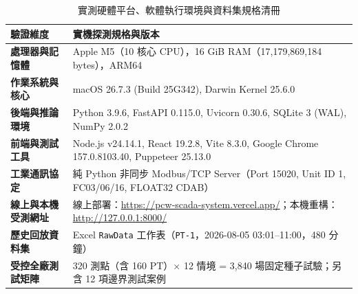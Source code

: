 \documentclass[fontset=none, a4paper, 12pt]{ctexart}
\begin{document}
\begin{doublespace}
\begin{table}[H]
\centering
\caption{實測硬體平台、軟體執行環境與資料集規格清冊}
\label{tab:env_real}
\footnotesize
\renewcommand{\arraystretch}{1.15}
\setlength{\tabcolsep}{5pt}
\begin{tabularx}{0.96\textwidth}{>{\bfseries}lX}
\toprule
驗證維度 & 實機探測規格與版本 \\
\midrule
處理器與記憶體 & Apple M5（10 核心 CPU），16 GiB RAM（17,179,869,184 bytes），ARM64 \\
作業系統與核心 & macOS 26.7.3 (Build 25G342), Darwin Kernel 25.6.0 \\
後端與推論環境 & Python 3.9.6, FastAPI 0.115.0, Uvicorn 0.30.6, SQLite 3 (WAL), NumPy 2.0.2 \\
前端與測試工具 & Node.js v24.14.1, React 19.2.8, Vite 8.3.0, Google Chrome 157.0.8103.40, Puppeteer 25.13.0 \\
工業通訊協定 & 純 Python 非同步 Modbus/TCP Server（Port 15020, Unit ID 1, FC03/06/16, FLOAT32 CDAB） \\
線上與本機受測網址 & 線上部署：\url{https://pcw-scada-system.vercel.app/}；本機重構：\url{http://127.0.0.1:8000/} \\
歷史回放資料集 & Excel \texttt{RawData} 工作表（\texttt{PT-1}，2026-08-05 03:01--11:00，480 分鐘） \\
受控全廠測試矩陣 & 320 測點（含 160 PT）$\times$ 12 情境 = 3,840 場固定種子試驗；另含 12 項邊界測試案例 \\
\bottomrule
\end{tabularx}
\end{table}


\end{doublespace}
\end{document}
